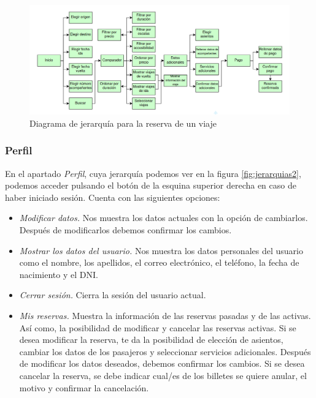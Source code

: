 \begin{figure}
      \centering
      \includegraphics[width=0.8\linewidth]{./Imagenes/jerarquia-viaje.png}
      \caption{Diagrama de jerarquía para la reserva de un viaje}
      \label{fig:jerarquias1}
\end{figure}

\subsubsection{Perfil}

En el apartado \textit{Perfil}, cuya jerarquía podemos ver en la figura \ref{fig:jerarquias2},
podemos acceder pulsando el botón de la esquina superior derecha en caso de haber iniciado sesión. Cuenta
con las siguientes opciones:

\begin{itemize}
      \item \textit{Modificar datos.} Nos muestra los datos actuales con la opción de cambiarlos. Después
            de modificarlos debemos confirmar los cambios.
      \item \textit{Mostrar los datos del usuario.} Nos muestra los datos personales del usuario como
            el nombre, los apellidos, el correo electrónico, el teléfono, la fecha de nacimiento
            y el DNI.
      \item \textit{Cerrar sesión.} Cierra la sesión del usuario actual.
      \item \textit{Mis reservas.} Muestra la información de las reservas pasadas y de las activas. Así
            como, la posibilidad de modificar y cancelar las reservas activas. Si se desea
            modificar la reserva, te da la posibilidad de elección de asientos, cambiar los datos
            de los pasajeros y seleccionar servicios adicionales. Después de modificar los datos
            deseados, debemos confirmar los cambios. Si se desea cancelar la reserva, se debe
            indicar cual/es de los billetes se quiere anular, el motivo y confirmar la cancelación.
\end{itemize}

